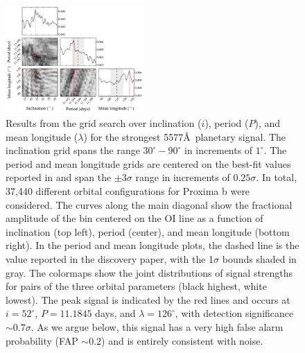 \documentclass{emulateapj}
\begin{document}
\begin{figure}[bt]
\includegraphics[width=0.47\textwidth]{5577_triangle.pdf}
\caption{Results from the grid search over inclination ($i$), period ($P$), and mean longitude ($\lambda$) for the strongest 5577\AA\ planetary signal. The inclination grid spans the range $30^\circ - 90^\circ$ in increments of $1^\circ$. The period and mean longitude grids are centered on the best-fit values reported in \citet{Anglada-Escude2016} and span the $\pm 3\sigma$ range in increments of $0.25\sigma$. In total, 37,440 different orbital configurations for Proxima b were considered. The curves along the main diagonal show the fractional amplitude of the bin centered on the OI line as a function of inclination (top left), period (center), and mean longitude (bottom right). In the period and mean longitude plots, the dashed line is the value reported in the discovery paper, with the 1$\sigma$ bounds shaded in gray. The colormaps show the joint distributions of signal strengths for pairs of the three orbital parameters (black highest, white lowest). The peak signal is indicated by the red lines and occurs at $i = 52^\circ$, $P = 11.1845$ days, and $\lambda = 126^\circ$, with detection significance ${\sim}0.7\sigma$. As we argue below, this signal has a very high false alarm probability (FAP ${\sim} 0.2$) and is entirely consistent with noise.}
\label{fig:triangle}
\end{figure}
\end{document}

